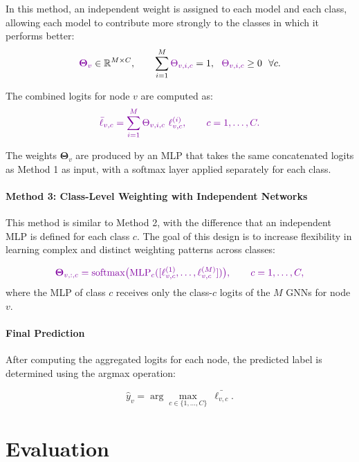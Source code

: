 \documentclass[a4paper,fleqn]{cas-sc}
\DeclareRobustCommand{\revcommon}[2][]{\textcolor{revshared}{#2}} %
\begin{document}
In this method, an independent weight is assigned to each model and each class, allowing each model to contribute more strongly to the classes in which it performs better:
\begin{equation}
\revcommon[R1,R4]{\mathbf{\Theta}_v}\in\mathbb{R}^{M\times C}, \qquad
\sum_{i=1}^{M}\revcommon[R1,R4]{\Theta_{v,i,c}}=1,\ \ \revcommon[R1,R4]{\Theta_{v,i,c}}\ge 0 \ \ \forall c.
\end{equation}

The combined logits for node $v$ are computed as:
\begin{equation}
\revcommon[R1,R4]{\bar{\ell}_{v,c}=\sum_{i=1}^{M}\Theta_{v,i,c}\ \ell^{(i)}_{v,c}, \qquad c=1,\dots,C.}
\end{equation}

The \revcommon[R1,R4]{weights $\mathbf{\Theta}_v$ are produced by an MLP that takes the same concatenated logits as Method 1 as input,} with a softmax layer applied separately for each class.

\paragraph{Method 3: Class-Level Weighting with Independent Networks}

This method is similar to Method 2, with the difference that an independent MLP is defined for each class $c$. The goal of this design is to increase flexibility in learning complex and distinct weighting patterns across classes:

\begin{equation}
\revcommon[R1,R4]{\mathbf{\Theta}_{v,:,c}=\mathrm{softmax}\big(\mathrm{MLP}_c([\ell^{(1)}_{v,c},\dots,\ell^{(M)}_{v,c}])\big), \qquad c=1,\dots,C,}
\end{equation}
\revcommon[R1,R4]{where the MLP of class $c$ receives only the class-$c$ logits of the $M$ GNNs for node $v$.}

\paragraph{Final Prediction}

After computing the aggregated logits for each node, the predicted label is determined using the argmax operation:

\begin{equation}
\hat{y}_v=\arg\max_{c\in\{1,\dots,C\}}\ \bar{\ell_{v,c}}.
\end{equation}

\section{Evaluation}\label{sec:Evaluation}
\end{document}

